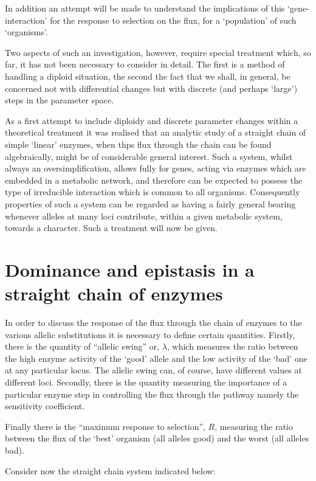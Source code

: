 In addition an attempt will be made to understand the implications of this `gene-interaction' for the response to selection on the flux, for a `population' of such `organisms'.

Two aspects of such an investigation, however, require special treatment which, so far, it has not been necessary to consider in detail. The first is a method of handling a diploid situation, the second the fact that we shall, in general, be concerned not with differential changes but with discrete (and perhaps `large') steps in the parameter space.

As a first attempt to include diploidy and discrete parameter changes within a theoretical treatment it was realised that an analytic study of a straight chain of simple `linear' enzymes, when thps flux through the chain can be found algebraically, might be of considerable general interest. Such a system, whilst always an oversimplification, allows fully for genes, acting via enzymes which are embedded in a metabolic network, and therefore can be expected to possess the type of irreducible interaction which is common to all organisms. Consequently properties of such a system can be regarded as having a fairly general bearing whenever alleles at many loci contribute, within a given metabolic system, towards a character. Such a treatment will now be given.

\section{Dominance and epistasis in a straight chain of enzymes}

In order to discuss the response of the flux through the chain of enzymes to the various allelic substitutions it is necessary to define certain quantities. Firstly, there is the quantity of ``allelic swing'' or, $\lambda$, which measures the ratio between the high enzyme activity of the `good' allele and the low activity of the `bad' one at any particular locus. The allelic swing can, of course, have different values at different loci. Secondly, there is the quantity measuring the importance of a particular enzyme step in controlling the flux through the pathway namely the sensitivity coefficient.

Finally there is the ``maximum response to selection'', $R$, measuring the ratio between the flux of the `best' organism (all alleles good) and the worst (all alleles bad). 

Consider now the straight chain system indicated below:

